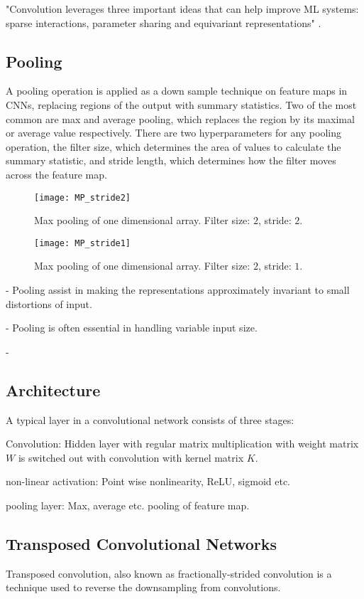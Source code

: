 \documentclass[../../thesis.tex]{subfiles}
\begin{document}
"Convolution leverages three important ideas that can help improve ML systems: sparse interactions, parameter sharing and equivariant representations" \cite{deeplearningbook}.

\subsection{Pooling}
A pooling operation is applied as a down sample technique on feature maps in CNNs, replacing regions of the output with summary statistics. Two of the most common are max and average pooling, which replaces the region by its maximal or average value respectively. There are two hyperparameters for any pooling operation, the filter size, which determines the area of values to calculate the summary statistic, and stride length, which determines how the filter moves across the feature map. 

\begin{figure}[h]
    \texttt{[image: MP\_stride2]}
    \centering    
    \caption{Max pooling of one dimensional array. Filter size: $2$, stride: $2$.}
\end{figure}
\begin{figure}[h]
    \texttt{[image: MP\_stride1]}
    \centering    
    \caption{Max pooling of one dimensional array. Filter size: $2$, stride: $1$.}
\end{figure}

- Pooling assist in making the representations approximately invariant to small distortions of input. 

- Pooling is often essential in handling variable input size.

- 

\subsection{Architecture}
A typical layer in a convolutional network consists of three stages: 

Convolution: Hidden layer with regular matrix multiplication with weight matrix $W$ is switched out with convolution with kernel matrix $K$.

non-linear activation: Point wise nonlinearity, ReLU, sigmoid etc.

pooling layer: Max, average etc. pooling of feature map.





\subsection{Transposed Convolutional Networks}
Transposed convolution, also known as fractionally-strided convolution is a technique used to reverse the downsampling from convolutions. 
\end{document}
